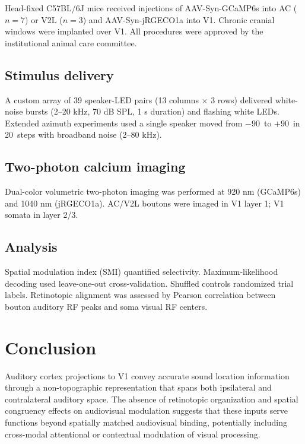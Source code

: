 \documentclass[11pt]{article}
\begin{document}
Head-fixed C57BL/6J mice received injections of AAV-Syn-GCaMP6s \citep{chen2012} into AC ($n = 7$) or V2L ($n = 3$) and AAV-Syn-jRGECO1a \citep{dana2016} into V1. Chronic cranial windows were implanted over V1. All procedures were approved by the institutional animal care committee.

\subsection{Stimulus delivery}

A custom array of 39 speaker-LED pairs (13 columns $\times$ 3 rows) delivered white-noise bursts (2--20 kHz, 70 dB SPL, 1 s duration) and flashing white LEDs. Extended azimuth experiments used a single speaker moved from $-90$\textdegree\ to $+90$\textdegree\ in 20\textdegree\ steps with broadband noise (2--80 kHz).

\subsection{Two-photon calcium imaging}

Dual-color volumetric two-photon imaging was performed at 920 nm (GCaMP6s) and 1040 nm (jRGECO1a). AC/V2L boutons were imaged in V1 layer 1; V1 somata in layer 2/3.

\subsection{Analysis}

Spatial modulation index (SMI) quantified selectivity. Maximum-likelihood decoding used leave-one-out cross-validation. Shuffled controls randomized trial labels. Retinotopic alignment was assessed by Pearson correlation between bouton auditory RF peaks and soma visual RF centers.

\section{Conclusion}

Auditory cortex projections to V1 convey accurate sound location information through a non-topographic representation that spans both ipsilateral and contralateral auditory space. The absence of retinotopic organization and spatial congruency effects on audiovisual modulation suggests that these inputs serve functions beyond spatially matched audiovisual binding, potentially including cross-modal attentional or contextual modulation of visual processing.



\end{document}
